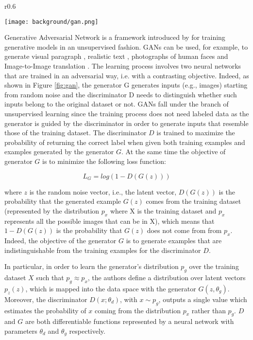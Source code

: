 \begin{wrapfigure}{r}{0.6\textwidth}
  \begin{center}
    \texttt{[image: background/gan.png]}
  \end{center}
  \caption{GAN diagram}
  \label{fig:gan}
\end{wrapfigure}

Generative Adversarial Network is a framework introduced by \citet{art:gan} for training generative models in an unsupervised fashion. GANs can be used, for example, to generate visual paragraph \citep{Liang_2017_ICCV}, realistic text \citep{pmlr-v70-zhang17b}, photographs of human faces \citep{https://doi.org/10.48550/arxiv.1710.10196} and Image-to-Image translation \citep{Isola_2017_CVPR}.
The learning process involves two neural networks that are trained in an adversarial way, i.e. with a contrasting objective. Indeed, as shown in Figure \ref{fig:gan}, the generator G generates inputs (e.g., images) starting from random noise and the discriminator D needs to distinguish whether such inputs belong to the original dataset or not. GANs fall under the branch of unsupervised learning since the training process does not need labeled data as the generator is guided by the discriminator in order to generate inputs that resemble those of the training dataset. The discriminator $D$ is trained to maximize the probability of returning the correct label when given both training examples and examples generated by the generator $G$. At the same time the objective of generator $G$ is to minimize the following loss function:

\begin{equation}
  \label{eq:gloss}
  L_G =log(1-D(G(z)))
\end{equation}

where $z$ is the random noise vector, i.e., the latent vector, $D(G(z))$ is the probability that the generated example $G(z)$ comes from the training dataset (represented by the distribution $p_{x}$ where X is the training dataset and $p_{x}$ represents all the possible images that can be in X), which means that $1-D(G(z))$ is the probability that $G(z)$ does not come from from $p_{x}$. Indeed, the objective of the generator $G$ is to generate examples that are indistinguishable from the training examples for the discriminator $D$.

In particular, in order to learn the generator's distribution $p_{g}$ over the training dataset $X$ such that $p_{g}\approx p_{x}$, the authors define a distribution over latent vectors $p_{z}(z)$, which is mapped into the data space with the generator $G(z, \theta_{g})$. Moreover, the discriminator $D(x;\theta_{d})$, with $x \sim p_{g}$, outputs a single value which estimates the probability of $x$ coming from the distribution $p_{x}$ rather than $p_{g}$. $D$ and $G$ are both differentiable functions represented by a neural network with parameters $\theta_{d}$ and $\theta_{g}$ respectively.

